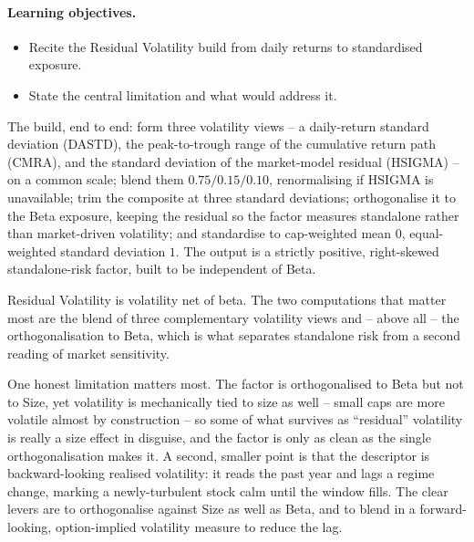\documentclass[11pt]{article}
\theoremstyle{definition}
\theoremstyle{plain}
\theoremstyle{remark}
\begin{document}
\paragraph{Learning objectives.}
\begin{itemize}[leftmargin=1.4em,topsep=2pt]
  \item Recite the Residual Volatility build from daily returns to standardised exposure.
  \item State the central limitation and what would address it.
\end{itemize}

The build, end to end: form three volatility views -- a daily-return standard deviation (DASTD), the peak-to-trough range of the cumulative return path (CMRA), and the standard deviation of the market-model residual (HSIGMA) -- on a common scale; blend them $0.75/0.15/0.10$, renormalising if HSIGMA is unavailable; trim the composite at three standard deviations; orthogonalise it to the Beta exposure, keeping the residual so the factor measures standalone rather than market-driven volatility; and standardise to cap-weighted mean $0$, equal-weighted standard deviation $1$. The output is a strictly positive, right-skewed standalone-risk factor, built to be independent of Beta.

\begin{keyresult}
Residual Volatility is volatility net of beta. The two computations that matter most are the blend of three complementary volatility views and -- above all -- the orthogonalisation to Beta, which is what separates standalone risk from a second reading of market sensitivity.
\end{keyresult}

\begin{pitfall}
One honest limitation matters most. The factor is orthogonalised to Beta but not to Size, yet volatility is mechanically tied to size as well -- small caps are more volatile almost by construction -- so some of what survives as ``residual'' volatility is really a size effect in disguise, and the factor is only as clean as the single orthogonalisation makes it. A second, smaller point is that the descriptor is backward-looking realised volatility: it reads the past year and lags a regime change, marking a newly-turbulent stock calm until the window fills. The clear levers are to orthogonalise against Size as well as Beta, and to blend in a forward-looking, option-implied volatility measure to reduce the lag.
\end{pitfall}
\end{document}
